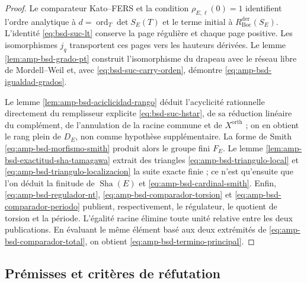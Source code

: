 \begin{proof}
Le comparateur Kato--FERS et la condition
\(\rho_{E,\ell}(0)=1\) identifient l'ordre analytique à
\(d=\operatorname{ord}_T\det S_E(T)\) et le terme initial à
\(R_{\mathrm{Boc}}^{\mathrm{der}}(S_E)\). L'identité
\eqref{eq:bsd-suc-lt} conserve la page régulière et chaque page positive. Les
isomorphismes \(j_q\) transportent ces pages vers les hauteurs dérivées. Le
lemme \ref{lem:amp-bsd-grado-pt} construit l'isomorphisme du drapeau avec le
réseau libre de Mordell--Weil et, avec
\eqref{eq:bsd-suc-carry-orden}, démontre
\eqref{eq:amp-bsd-igualdad-grados}.

Le lemme \ref{lem:amp-bsd-aciclicidad-rango} déduit l'acyclicité rationnelle
directement du remplisseur explicite \eqref{eq:bsd-suc-hstar}, de sa réduction
linéaire du complément, de l'annulation de la racine commune et de
\(X^{\mathrm{orth}}\) ; on en obtient le rang plein de \(D_E\), non
comme hypothèse supplémentaire. La forme de Smith
\eqref{eq:amp-bsd-morfismo-smith} produit alors le groupe fini \(F_E\).
Le lemme \ref{lem:amp-bsd-exactitud-sha-tamagawa} extrait des triangles
\eqref{eq:amp-bsd-triangulo-local} et
\eqref{eq:amp-bsd-triangulo-localizacion} la suite exacte finie ; ce n'est
qu'ensuite que l'on déduit la finitude de \(\operatorname{Sha}(E)\) et
\eqref{eq:amp-bsd-cardinal-smith}. Enfin,
\eqref{eq:amp-bsd-regulador-nt},
\eqref{eq:amp-bsd-comparador-torsion} et
\eqref{eq:amp-bsd-comparador-periodo} publient, respectivement, le régulateur,
le quotient de torsion et la période. L'égalité racine élimine toute unité
relative entre les deux publications. En évaluant le même élément basé aux
deux extrémités de \eqref{eq:amp-bsd-comparador-total}, on obtient
\eqref{eq:amp-bsd-termino-principal}.
\end{proof}

\subsection{Prémisses et critères de réfutation}
\label{subsec:amp-bsd-falsadores}

